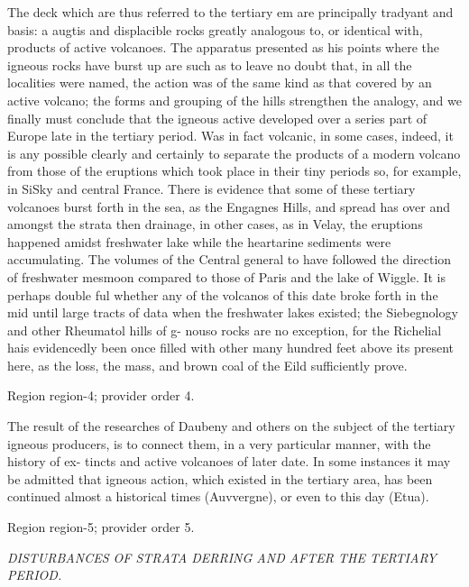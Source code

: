 \documentclass[11pt]{article}
\begin{document}
The deck which are thus referred to the tertiary em are principally tradyant and basis: a augtis and displacible rocks greatly analogous to, or identical with, products of active volcanoes. The apparatus presented as his points where the igneous rocks have burst up are such as to leave no doubt that, in all the localities were named, the action was of the same kind as that covered by an active volcano; the forms and grouping of the hills strengthen the analogy, and we finally must conclude that the igneous active developed over a series part of Europe late in the tertiary period. Was in fact volcanic, in some cases, indeed, it is any possible clearly and certainly to separate the products of a modern volcano from those of the eruptions which took place in their tiny periods so, for example, in SiSky and central France. There is evidence that some of these tertiary volcanoes burst forth in the sea, as the Engagnes Hills, and spread has over and amongst the strata then drainage, in other cases, as in Velay, the eruptions happened amidst freshwater lake while the heartarine sediments were accumulating. The volumes of the Central general to have followed the direction of freshwater mesmoon compared to those of Paris and the lake of Wiggle. It is perhaps double ful whether any of the volcanos of this date broke forth in the mid until large tracts of data when the freshwater lakes existed; the Siebegnology and other Rheumatol hills of g- nouso rocks are no exception, for the Richelial hais evidencedly been once filled with other many hundred feet above its present here, as the loss, the mass, and brown coal of the Eild sufficiently prove.
\par

{\scriptsize\color{gray} Region region-4; provider order 4.\par}
\medskip

The result of the researches of Daubeny and others on the subject of the tertiary igneous producers, is to connect them, in a very particular manner, with the history of ex- tincts and active volcanoes of later date. In some instances it may be admitted that igneous action, which existed in the tertiary area, has been continued almost a historical times (Auvvergne), or even to this day (Etua).
\par

{\scriptsize\color{gray} Region region-5; provider order 5.\par}
\medskip

{\small\itshape DISTURBANCES OF STRATA DERRING AND AFTER THE TERTIARY PERIOD.\par}
\end{document}
